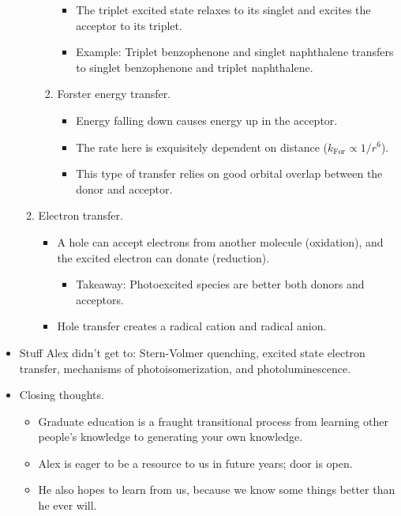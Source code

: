 \documentclass[../notes.tex]{subfiles}
\begin{document}
\begin{itemize}
\begin{enumerate}
\begin{enumerate}
            \begin{itemize}
                \item The triplet excited state relaxes to its singlet and excites the acceptor to its triplet.
                \item Example: Triplet benzophenone and singlet naphthalene transfers to singlet benzophenone and triplet naphthalene.
            \end{itemize}
            \item Forster energy transfer.
            \begin{itemize}
                \item Energy falling down causes energy up in the acceptor.
                \item The rate here is exquisitely dependent on distance ($k_\text{For}\propto1/r^6$).
                \item This type of transfer relies on good orbital overlap between the donor and acceptor.
            \end{itemize}
        \end{enumerate}
        \item Electron transfer.
        \begin{itemize}
            \item A hole can accept electrons from another molecule (oxidation), and the excited electron can donate (reduction).
            \begin{itemize}
                \item Takeaway: Photoexcited species are better both donors and acceptors.
            \end{itemize}
            \item Hole transfer creates a radical cation and radical anion.
        \end{itemize}
    \end{enumerate}
    \item Stuff Alex didn't get to: Stern-Volmer quenching, excited state electron transfer, mechanisms of photoisomerization, and photoluminescence.
    \item Closing thoughts.
    \begin{itemize}
        \item Graduate education is a fraught transitional process from learning other people's knowledge to generating your own knowledge.
        \item Alex is eager to be a resource to us in future years; door is open.
        \item He also hopes to learn from us, because we know some things better than he ever will.
    \end{itemize}
\end{itemize}
\end{document}
